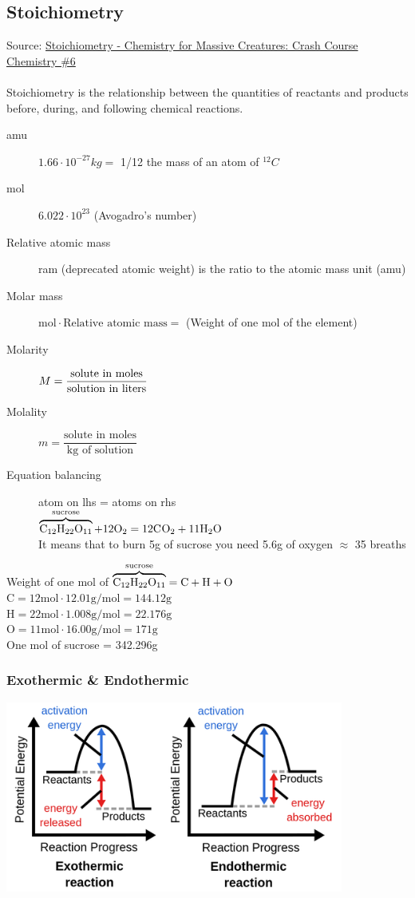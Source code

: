 \subsection{Stoichiometry}
Source: \href{https://www.youtube.com/watch?v=UL1jmJaUkaQ&list=PL8dPuuaLjXtPHzzYuWy6fYEaX9mQQ8oGr&index=7}{Stoichiometry - Chemistry for Massive Creatures: Crash Course Chemistry \#6}
\\\\
Stoichiometry is the relationship between the quantities of reactants and products before, during, and following chemical reactions.

\begin{description}
    \item[amu] $1.66 \cdot 10^{-27}kg =$ 1/12 the mass of an atom of $^{12}C$
    \item[mol] $6.022 \cdot 10^{23}$ (Avogadro's number)
    \item[Relative atomic mass] ram (deprecated atomic weight) is the ratio to the atomic mass unit (amu)
    \item[Molar mass] $\text{mol} \cdot \text{Relative atomic mass} =$ (Weight of one mol of the element)
    \item[Molarity] $M = \dfrac{\text{solute in moles}}{\text{solution\space in\space liters}}$
    \item[Molality]  $m = \dfrac{\text{solute in moles}}{\text{kg of solution}}$
    \item[Equation balancing] atom on lhs = atoms on rhs\\
        $\overbrace{\text{C}_{12}\text{H}_{22}\text{O}_{11}}^{\text{sucrose}} + 12\text{O}_{2} = 12\text{C}_{}\text{O}_{2} + 11\text{H}_{2}\text{O}_{}$\\
        It means that to burn 5g of sucrose you need 5.6g of oxygen $\approx$ 35 breaths
\end{description}
%
Weight of one mol of $\overbrace{\text{C}_{12}\text{H}_{22}\text{O}_{11}}^{\text{sucrose}} = \text{C} + \text{H} + \text{O}$\\
$\text{C} = 12 \text{mol} \cdot 12.01\text{g/mol} = 144.12\text{g}$\\
$\text{H} = 22 \text{mol} \cdot 1.008\text{g/mol} = 22.176\text{g}$\\
$\text{O} = 11 \text{mol} \cdot 16.00\text{g/mol} = 171\text{g}$\\
One mol of sucrose = 342.296g

\subsubsection{Exothermic \& Endothermic}
\includegraphics[width=30em]{./includes/chemistry/imgs/exo_endo.png}